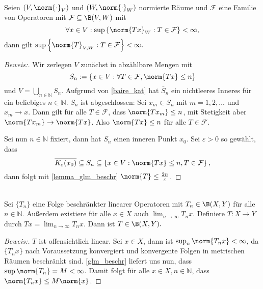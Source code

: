 \begin{theorem} \label{glm_beschr} \\
	Seien $(V, \norm{\cdot}_V)$ und $(W, \norm{\cdot}_W)$ normierte Räume und $\mathcal{F}$ eine Familie von Operatoren mit $\mathcal{F} \subseteq \B(V, W)$ mit 
	\[
	\forall x \in V: \sup{\left\{\norm{Tx}_W: T \in \mathcal{F}\right\}} < \infty,
	\] 
	dann gilt $\sup{\left\{\norm{T}_{V, W}: T \in \mathcal{F}\right\}} < \infty.$
	
	\begin{proof}[Beweis:] 
		Wir zerlegen $V$ zunächst in abzählbare Mengen mit 
		\[
		S_n := \left\{ x \in V: \forall T \in \mathcal{F}, \norm{Tx} \leq n \right\} 
		\]
		und $V = \bigcup_{n \in \mathbb{N}} S_n$. Aufgrund von \ref{baire_kat} hat $\bar{S}_n$ ein nichtleeres Inneres für ein beliebiges $n \in \mathbb{N}$. $S_n$ ist abgeschlossen: Sei $x_m \in S_n$ mit $m = 1, 2, \ldots$ und $x_m \to x$. Dann gilt für alle $T \in \mathcal{F}$, dass $\norm{Tx_m} \leq n$, mit Stetigkeit aber $\norm{Tx_m} \to \norm{Tx}$. Also $\norm{Tx} \leq n$ für alle $T \in \mathcal{F}$.
		
		Sei nun $n \in \mathbb{N}$ fixiert, dann hat $S_n$ einen inneren Punkt $x_0$. Sei $\varepsilon > 0$ so gewählt, dass 
		\[
		\overline{K_{\varepsilon}(x_0)} \subseteq S_n \subseteq \left\{ x \in V: \norm{Tx} \leq n, T \in \mathcal{F} \right\},
		\]
		dann folgt mit \ref{lemma_glm_beschr} $\norm{T} \leq \frac{2n}{\varepsilon}$.
	\end{proof}
\end{theorem}

\begin{theorem} \\
	\label{Banach_Steinhaus}
	Sei $\{T_n\}$ eine Folge beschränkter linearer Operatoren mit $T_n \in \B(X, Y)$ für alle $n \in \mathbb{N}$. Außerdem existiere für alle $x \in X$ auch $\lim_{n \to \infty} T_n x$. Definiere $T: X \to Y$ durch $Tx = \lim_{n \to \infty} T_n x$. Dann ist $T \in \B(X, Y).$
	
	\begin{proof}[Beweis:] 
		$T$ ist offensichtlich linear. Sei $x \in X$, dann ist $\sup_{n}{\norm{T_n x}} < \infty$, da $\{T_n x\}$ nach Voraussetzung konvergiert und konvergente Folgen in metrischen Räumen beschränkt sind. \ref{glm_beschr} liefert uns nun, dass $\sup{\norm{T_n}} = M < \infty$. Damit folgt für alle $x \in X, n \in \mathbb{N}$, dass $\norm{T_n x} \leq M \norm{x}$.
	\end{proof}
\end{theorem}




